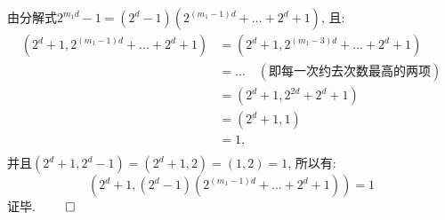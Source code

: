 \documentclass{article}
\begin{document}
\begin{CJK}{UTF8}{gbsn}
  \newline
  由分解式$2^{m_1d} - 1 = (2^d - 1)(2^{(m_1 - 1)d} + ... + 2^d + 1)$, 且:
  \begin{equation*}
    \begin{aligned}
      (2^d + 1, 2^{(m_1 - 1)d} + ... + 2^d + 1) &= (2^d + 1, 2^{(m_1 - 3)d} + ... + 2^d + 1) \\
      &= \dots \quad (\mbox{即每一次约去次数最高的两项})\\
      &= (2^d + 1, 2^{2d} + 2^d + 1) \\
      &= (2^d + 1, 1) \\
      &= 1, \\
    \end{aligned}
  \end{equation*}
  并且$(2^d + 1, 2^d - 1) = (2^d + 1, 2) = (1, 2) = 1$, 所以有:
  \begin{equation*}
    (2^d + 1, (2^d - 1)(2^{(m_1 - 1)d} + ... + 2^d + 1)) = 1
  \end{equation*}
  证毕.
  $\hfill{} \qed$
\end{CJK}
\end{document}

